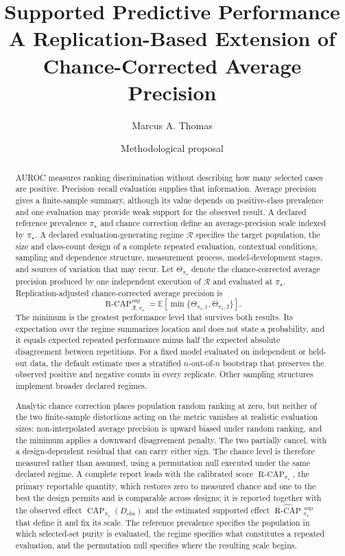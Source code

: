 \documentclass[11pt]{article}
\title{Supported Predictive Performance\\
\large A Replication-Based Extension of Chance-Corrected Average Precision}
\author{Marcus A. Thomas}
\date{Methodological proposal}
\newcommand{\CAP}{\operatorname{CAP}}
\newcommand{\Regime}{\mathcal{R}}
\newcommand{\Tpi}{\CAP_{\pi_\star}}
\newcommand{\E}{\mathbb{E}}
\newcommand{\RCAPfull}{\operatorname{R\text{-}CAP}^{\mathrm{sup}}_{\Regime,\pi_\star}}
\newcommand{\RCAPHat}{\widehat{\operatorname{R\text{-}CAP}}{}^{\,\mathrm{sup}}_{\pi_\star}}
\newcommand{\RCAPcal}{\operatorname{R\text{-}CAP}_{\pi_\star}}
\theoremstyle{remark}
\begin{document}
\maketitle

\begin{abstract}
AUROC measures ranking discrimination without describing how many selected cases are positive. Precision--recall evaluation supplies that information. Average precision gives a finite-sample summary, although its value depends on positive-class prevalence and one evaluation may provide weak support for the observed result. A declared reference prevalence $\pi_\star$ and chance correction define an average-precision scale indexed by $\pi_\star$. A declared evaluation-generating regime $\Regime$ specifies the target population, the size and class-count design of a complete repeated evaluation, contextual conditions, sampling and dependence structure, measurement process, model-development stages, and sources of variation that may recur. Let $\Theta_{\pi_\star}$ denote the chance-corrected average precision produced by one independent execution of $\Regime$ and evaluated at $\pi_\star$. Replication-adjusted chance-corrected average precision is
\[
\RCAPfull
=
\E\!\left[
\min\{\Theta_{\pi_\star,1},\Theta_{\pi_\star,2}\}
\right].
\]
The minimum is the greatest performance level that survives both results. Its expectation over the regime summarizes location and does not state a probability, and it equals expected repeated performance minus half the expected absolute disagreement between repetitions. For a fixed model evaluated on independent or held-out data, the default estimate uses a stratified $n$-out-of-$n$ bootstrap that preserves the observed positive and negative counts in every replicate. Other sampling structures implement broader declared regimes.

Analytic chance correction places population random ranking at zero, but neither of the two finite-sample distortions acting on the metric vanishes at realistic evaluation sizes: non-interpolated average precision is upward biased under random ranking, and the minimum applies a downward disagreement penalty. The two partially cancel, with a design-dependent residual that can carry either sign. The chance level is therefore measured rather than assumed, using a permutation null executed under the same declared regime. A complete report leads with the calibrated score $\RCAPcal$, the primary reportable quantity, which restores zero to measured chance and one to the best the design permits and is comparable across designs; it is reported together with the observed effect $\Tpi(D_{\mathrm{obs}})$ and the estimated supported effect $\RCAPHat$ that define it and fix its scale. The reference prevalence specifies the population in which selected-set purity is evaluated, the regime specifies what constitutes a repeated evaluation, and the permutation null specifies where the resulting scale begins.
\end{abstract}
\end{document}
